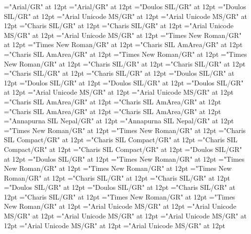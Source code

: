 \documentclass[a4paper]{article}
\begin{document}
\font\divkfaxrom="Arial/GR" at 12pt
\font\spankfaxrom="Arial/GR" at 12pt
\font\divkjofonipa="Doulos SIL/GR" at 12pt
\font\spankjofonipa="Doulos SIL/GR" at 12pt
\font\divkjo="Arial Unicode MS/GR" at 12pt
\font\spankjo="Arial Unicode MS/GR" at 12pt
\font\divkm="Charis SIL/GR" at 12pt
\font\spankm="Charis SIL/GR" at 12pt
\font\divkn="Arial Unicode MS/GR" at 12pt
\font\spankn="Arial Unicode MS/GR" at 12pt
\font\divko="Times New Roman/GR" at 12pt
\font\spanko="Times New Roman/GR" at 12pt
\font\divmiz="Charis SIL AmArea/GR" at 12pt
\font\spanmiz="Charis SIL AmArea/GR" at 12pt
\font\divml="Times New Roman/GR" at 12pt
\font\spanml="Times New Roman/GR" at 12pt
\font\divms="Charis SIL/GR" at 12pt
\font\spanms="Charis SIL/GR" at 12pt
\font\divmsnVUfonipaxemic="Charis SIL/GR" at 12pt
\font\spanmsnVUfonipaxemic="Charis SIL/GR" at 12pt
\font\divmtrfonipa="Doulos SIL/GR" at 12pt
\font\spanmtrfonipa="Doulos SIL/GR" at 12pt
\font\divmtrQaaaxTran="Doulos SIL/GR" at 12pt
\font\spanmtrQaaaxTran="Doulos SIL/GR" at 12pt
\font\divmtr="Arial Unicode MS/GR" at 12pt
\font\spanmtr="Arial Unicode MS/GR" at 12pt
\font\divmxbfonipa="Charis SIL AmArea/GR" at 12pt
\font\spanmxbfonipa="Charis SIL AmArea/GR" at 12pt
\font\divmxb="Charis SIL AmArea/GR" at 12pt
\font\spanmxb="Charis SIL AmArea/GR" at 12pt
\font\divneDeva="Annapurna SIL Nepal/GR" at 12pt
\font\spanneDeva="Annapurna SIL Nepal/GR" at 12pt
\font\divne="Times New Roman/GR" at 12pt
\font\spanne="Times New Roman/GR" at 12pt
\font\divnnhfonipa="Charis SIL Compact/GR" at 12pt
\font\spannnhfonipa="Charis SIL Compact/GR" at 12pt
\font\divnnh="Charis SIL Compact/GR" at 12pt
\font\spannnh="Charis SIL Compact/GR" at 12pt
\font\divpkrfonipa="Doulos SIL/GR" at 12pt
\font\spanpkrfonipa="Doulos SIL/GR" at 12pt
\font\divpkr="Times New Roman/GR" at 12pt
\font\spanpkr="Times New Roman/GR" at 12pt
\font\divpt="Times New Roman/GR" at 12pt
\font\spanpt="Times New Roman/GR" at 12pt
\font\divqaaDevaINfonipaxaadetic="Charis SIL/GR" at 12pt
\font\spanqaaDevaINfonipaxaadetic="Charis SIL/GR" at 12pt
\font\divqaafonipaxoadetic="Doulos SIL/GR" at 12pt
\font\spanqaafonipaxoadetic="Doulos SIL/GR" at 12pt
\font\divqaafonipaxpal="Charis SIL/GR" at 12pt
\font\spanqaafonipaxpal="Charis SIL/GR" at 12pt
\font\divqaaINfonipaxpho="Times New Roman/GR" at 12pt
\font\spanqaaINfonipaxpho="Times New Roman/GR" at 12pt
\font\divqaaQaaaxhalehlb="Arial Unicode MS/GR" at 12pt
\font\spanqaaQaaaxhalehlb="Arial Unicode MS/GR" at 12pt
\font\divqaaxoad="Arial Unicode MS/GR" at 12pt
\font\spanqaaxoad="Arial Unicode MS/GR" at 12pt
\font\divqaaxodr="Arial Unicode MS/GR" at 12pt
\font\spanqaaxodr="Arial Unicode MS/GR" at 12pt
\end{document}
